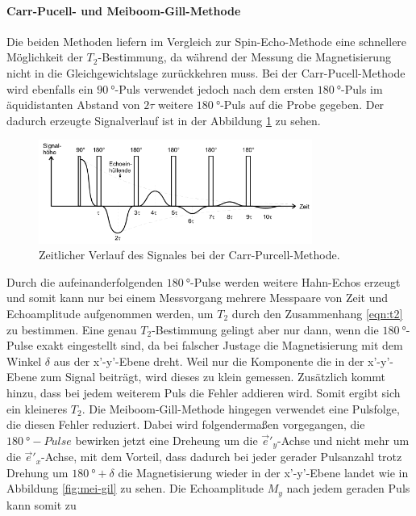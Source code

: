 \paragraph{Carr-Pucell- und Meiboom-Gill-Methode}
Die beiden Methoden liefern im Vergleich zur Spin-Echo-Methode eine
schnellere Möglichkeit der $T_2$-Bestimmung, da während der Messung die Magnetisierung
nicht in die Gleichgewichtslage zurückkehren muss.
Bei der Carr-Pucell-Methode wird ebenfalls ein $\SI{90}{\degree}$-Puls
verwendet jedoch nach dem ersten $\SI{180}{\degree}$-Puls
im äquidistanten Abstand von $2\tau$ weitere $\SI{180}{\degree}$-Puls
auf die Probe gegeben. Der dadurch erzeugte Signalverlauf
ist in der Abbildung \ref{fig:carr-pu} zu sehen.
\begin{figure}
  \centering
  \includegraphics[width=0.8\textwidth]{carr-pu.PNG}
  \caption{Zeitlicher Verlauf des Signales bei der Carr-Purcell-Methode.\cite{sample}}
  \label{fig:carr-pu}
\end{figure}
Durch die aufeinanderfolgenden $\SI{180}{\degree}$-Pulse werden
weitere Hahn-Echos erzeugt und
somit kann nur bei einem Messvorgang mehrere Messpaare von Zeit und
Echoamplitude aufgenommen werden, um $T_2$ durch den Zusammenhang \eqref{eqn:t2} zu bestimmen.
Eine genau $T_2$-Bestimmung gelingt aber nur dann,
wenn die $\SI{180}{\degree}$-Pulse exakt eingestellt sind, da
bei falscher Justage die Magnetisierung mit dem Winkel $\delta$ aus der x'-y'-Ebene
dreht. Weil nur die Komponente die in der x'-y'-Ebene zum Signal beiträgt,
wird dieses zu klein gemessen. Zusätzlich kommt hinzu, dass
bei jedem weiterem Puls die Fehler addieren wird.
Somit ergibt sich ein kleineres $T_2$.
Die Meiboom-Gill-Methode hingegen verwendet eine
Pulsfolge, die diesen Fehler reduziert. Dabei wird folgendermaßen
vorgegangen, die $\SI{180}{\degree}-Pulse$ bewirken
jetzt eine Dreheung um die $\vec{e}'_y$-Achse und nicht mehr
um die $\vec{e}'_x$-Achse, mit dem Vorteil, dass dadurch bei jeder
gerader Pulsanzahl trotz Drehung
um $\SI{180}{\degree}+\delta$ die Magnetisierung wieder in der x'-y'-Ebene
landet wie in Abbildung \ref{fig:mei-gil} zu sehen.
Die Echoamplitude $M_y$ nach jedem geraden Puls kann somit zu
